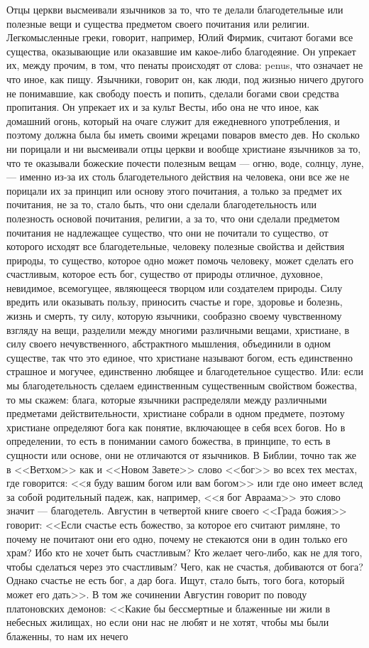 \documentclass[12pt]{article}
\begin{document}
Отцы церкви высмеивали язычников за то, что те делали благодетельные или полезные вещи и существа предметом своего почитания или религии. Легкомысленные греки, говорит, например, Юлий Фирмик, считают богами все существа, оказывающие или оказавшие им какое-либо благодеяние. Он упрекает их, между прочим, в том, что пенаты происходят от слова: penus, что означает не что иное, как пищу. Язычники, говорит он, как люди, под жизнью ничего другого не понимавшие, как свободу поесть и попить, сделали богами свои средства пропитания. Он упрекает их и за культ Весты, ибо она не что иное, как домашний огонь, который на очаге служит для ежедневного употребления, и поэтому должна была бы иметь своими жрецами поваров вместо дев. Но сколько ни порицали и ни высмеивали отцы церкви и вообще христиане язычников за то, что те оказывали божеские почести полезным вещам --- огню, воде, солнцу, луне, --- именно из-за их столь благодетельного действия на человека, они все же не порицали их за принцип или основу этого почитания, а только за предмет их почитания, не за то, стало быть, что они сделали благодетельность или полезность основой почитания, религии, а за то, что они сделали предметом почитания не надлежащее существо, что они не почитали то существо, от которого исходят все благодетельные, человеку полезные свойства и действия природы, то существо, которое одно может помочь человеку, может сделать его счастливым, которое есть бог, существо от природы отличное, духовное, невидимое, всемогущее, являющееся творцом или создателем природы. Силу вредить или оказывать пользу, приносить счастье и горе, здоровье и болезнь, жизнь и смерть, ту силу, которую язычники, сообразно своему чувственному взгляду на вещи, разделили между многими различными вещами, христиане, в силу своего нечувственного, абстрактного мышления, объединили в одном существе, так что это единое, что христиане называют богом, есть единственно страшное и могучее, единственно любящее и благодетельное существо. Или: если мы благодетельность сделаем единственным существенным свойством божества, то мы скажем: блага, которые язычники распределяли между различными предметами действительности, христиане собрали в одном предмете, поэтому христиане определяют бога как понятие, включающее в себя всех богов. Но в определении, то есть в понимании самого божества, в принципе, то есть в сущности или основе, они не отличаются от язычников. В Библии, точно так же в <<Ветхом>>  как и <<Новом Завете>>  слово <<бог>> во всех тех местах, где говорится: <<я буду вашим богом или вам богом>> или где оно имеет вслед за собой родительный падеж, как, например, <<я бог Авраама>>  это слово значит --- благодетель. Августин в четвертой книге своего <<Града божия>> говорит: <<Если счастье есть божество, за которое его считают римляне, то почему не почитают они его одно, почему не стекаются они в один только его храм? Ибо кто не хочет быть счастливым? Кто желает чего-либо, как не для того, чтобы сделаться через это счастливым? Чего, как не счастья, добиваются от бога? Однако счастье не есть бог, а дар бога. Ищут, стало быть, того бога, который может его дать>>. В том же сочинении Августин говорит по поводу платоновских демонов: <<Какие бы бессмертные и блаженные ни жили в небесных жилищах, но если они нас не любят и не хотят, чтобы мы были блаженны, то нам их нечего 
\end{document}
